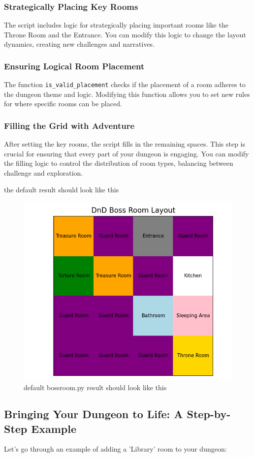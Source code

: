 \documentclass[10pt,twocolumn]{article}
\begin{document}
\subsubsection{Strategically Placing Key Rooms}
The script includes logic for strategically placing important rooms like the Throne Room and the Entrance. You can modify this logic to change the layout dynamics, creating new challenges and narratives.

\subsubsection{Ensuring Logical Room Placement}
The function \texttt{is\_valid\_placement} checks if the placement of a room adheres to the dungeon theme and logic. Modifying this function allows you to set new rules for where specific rooms can be placed.

\subsubsection{Filling the Grid with Adventure}
After setting the key rooms, the script fills in the remaining spaces. This step is crucial for ensuring that every part of your dungeon is engaging. You can modify the filling logic to control the distribution of room types, balancing between challenge and exploration.

the default result should look like this
\begin{figure}
    \centering
    \includegraphics[width=0.5\linewidth]{bossroom.png}
    \caption{default bossroom.py result should look like this}
    \label{fig:enter-label}
\end{figure}
\subsection{Bringing Your Dungeon to Life: A Step-by-Step Example}
Let's go through an example of adding a 'Library' room to your dungeon:
\end{document}
